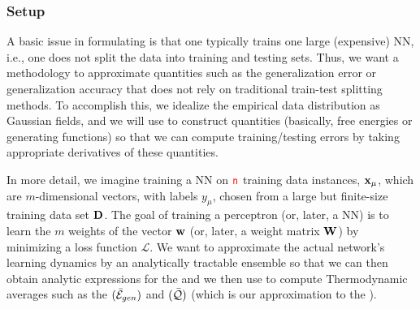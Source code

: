 \subsubsection{Setup}
\label{sxn:mathP_setup}

A basic issue in formulating \SETOL is that one typically trains one large (expensive) NN, i.e., one does not split the data into training and testing sets.
Thus, we want a methodology to approximate quantities such as the generalization error or generalization accuracy that does not rely on traditional train-test splitting methods.
To accomplish this, we idealize the empirical data distribution as Gaussian fields, and we will use \STATMECH to construct quantities (basically, free energies or generating functions) so that we can compute training/testing errors by taking appropriate derivatives of these quantities.

In more detail, we imagine training a NN on ${\color{red}\sf{n}}$ training data instances, ${\mathbf{x}}_{\mu}$, which are $m$-dimensional vectors,
with labels $y_{\mu}$, chosen from a large but finite-size training data set $\mathbf{D}$.
The goal of training a perceptron (or, later, a NN) is to learn the $m$ weights of the vector ${\mathbf{w}}$ (or, later, a weight matrix ${\mathbf{W}}$) by minimizing a loss function $\mathcal{L}$. 
We want to approximate the actual network’s learning dynamics by an analytically tractable ensemble
so that we can then obtain 
analytic expressions for the \emph{\FreeEnergy} and \emph{\GeneratingFunction} we then use to compute
Thermodynamic averages such as the \emph{\AverageGeneralizationError} $(\bar{\mathcal{E}}_{gen})$ and
\emph{\ModelQuality} $(\bar{\mathcal{Q}})$ (which is our approximation to the \emph{\AverageGeneralizationAccuracy}).



